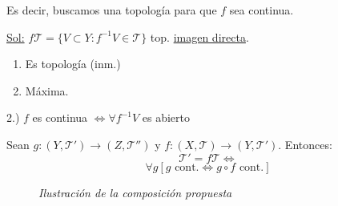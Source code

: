 Es decir, buscamos una topología para que $f$ sea continua.

\underline{Sol:} $f\mathcal{T} = \{V \subset Y: f^{-1}V \in \mathcal{T}\}$ top. \underline{imagen directa}.
\begin{prop}    
\begin{enumerate}
    \item Es topología (inm.)
    \item Máxima. 
\end{enumerate}
\end{prop}
\begin{demo}
2.) $f$ es continua $\Leftrightarrow \forall f^{-1} V$ es abierto
\end{demo}

\begin{theo}
Sean $g: \left( Y, \mathcal{T}' \right) \rightarrow \left( Z, \mathcal{T}'' \right)$ y $f: \left( X, \mathcal{T} \right) \rightarrow \left( Y, \mathcal{T}' \right)$. Entonces:
    \[
    \mathcal{T}' = f\mathcal{T} \Leftrightarrow  
    \]
    \begin{equation}\label{eq:prop_universal_directa}
        \forall g \left[ g \text{ cont.} \Leftrightarrow g \circ f \text{ cont.} \right]
    \end{equation}

    \begin{figure}[H]
        \centering    
        \caption{\textit{Ilustración de la composición propuesta}}
        \label{prop_universal_directas}
    \end{figure}
\end{theo}
